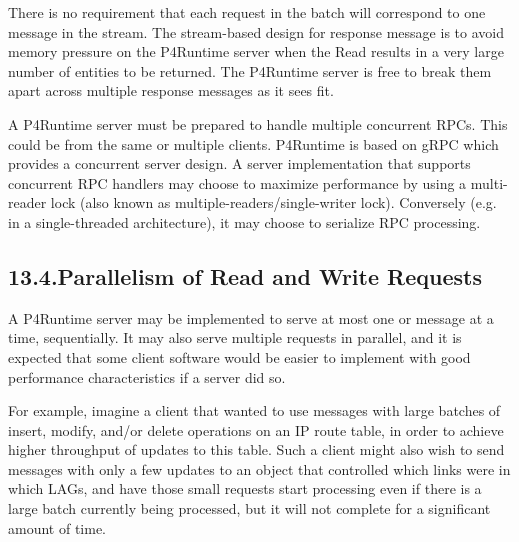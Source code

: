 \documentclass[11pt]{article}
\begin{document}
{%
There is no requirement that each request in the batch will correspond to one
 message in the stream. The stream-based design for response
message is to avoid memory pressure on the P4Runtime server when the Read
results in a very large number of entities to be returned. The P4Runtime server
is free to break them apart across multiple response messages as it sees fit.%

A P4Runtime server must be prepared to handle multiple concurrent  RPCs.
This could be from the same or multiple clients. P4Runtime is based on gRPC
which provides a concurrent server design. A server implementation that supports
concurrent RPC handlers may choose to maximize performance by using a
multi-reader lock (also known as multiple-readers/single-writer lock).
Conversely (e.g. in a single-threaded architecture), it may choose to serialize
 RPC processing.%

\subsection{13.4.\hspace*{0.5em}Parallelism of Read and Write Requests}\label{sec-parallelism-of-read-and-write-requests}%

\noindent{}A P4Runtime server may be implemented to serve at most one
 or  message at a time, sequentially.  It
may also serve multiple requests in parallel, and it is expected that
some client software would be easier to implement with good
performance characteristics if a server did so.%

For example, imagine a client that wanted to use 
messages with large batches of insert, modify, and/or delete
operations on an IP route table, in order to achieve higher throughput
of updates to this table.  Such a client might also wish to send
 messages with only a few updates to an 
object that controlled which links were in which LAGs, and have those
small requests start processing even if there is a large
 batch currently being processed, but it will not
complete for a significant amount of time.%

}
\end{document}
